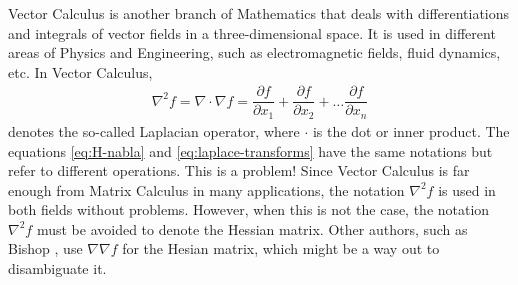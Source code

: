Vector Calculus is another branch of Mathematics that deals with differentiations and integrals of vector fields in a three-dimensional space. It is used in different areas of Physics and Engineering, such as electromagnetic fields, fluid dynamics, etc. In Vector Calculus,
\begin{align}
    \nabla^2 f = \nabla \cdot \nabla f = \dfrac{\partial f}{\partial x_1} + \dfrac{\partial f}{\partial x_2} + \dots \dfrac{\partial f}{\partial x_n}
    \label{eq:laplace-transforms}
\end{align}
denotes the so-called Laplacian operator, where \(\cdot\) is the dot or inner product. The equations \eqref{eq:H-nabla} and \eqref{eq:laplace-transforms} have the same notations but refer to different operations. This is a problem! Since Vector Calculus is far enough from Matrix Calculus in many applications, the notation \(\nabla^2 f\) is used in both fields without problems. However, when this is not the case, the notation \(\nabla^2 f\) must be avoided to denote the Hessian matrix. Other authors, such as Bishop \cite{bishopPatternRecognitionMachine2006}, use \(\nabla \nabla f\) for the Hesian matrix, which might be a way out to disambiguate it.
